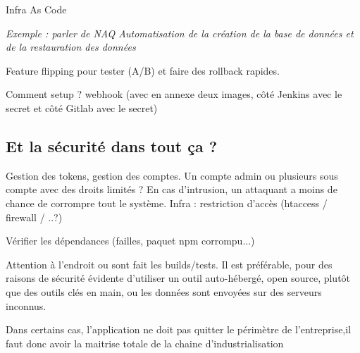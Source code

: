 Infra As Code %

\textit{Exemple : parler de NAQ Automatisation de la création de la base de données et de la restauration des données}

Feature flipping pour tester (A/B) et faire des rollback rapides.

Comment setup ? webhook (avec en annexe deux images, côté Jenkins avec le secret et côté Gitlab avec le secret)

\subsection{Et la sécurité dans tout ça ?}


Gestion des tokens, gestion des comptes.
Un compte admin ou plusieurs sous compte avec des droits limités ? En cas d'intrusion, un attaquant a moins de chance de corrompre tout le système.
Infra : restriction d'accès (htaccess / firewall / ..?)

Vérifier les dépendances (failles, paquet npm corrompu...)

Attention à l'endroit ou sont fait les builds/tests. Il est préférable, pour des raisons de sécurité évidente d'utiliser un outil auto-hébergé, open source, plutôt que des outils clés en main, ou les données sont envoyées sur des serveurs inconnus. 

Dans certains cas, l'application ne doit pas quitter le périmètre de l'entreprise,il faut donc avoir la maitrise totale de la chaine d'industrialisation
